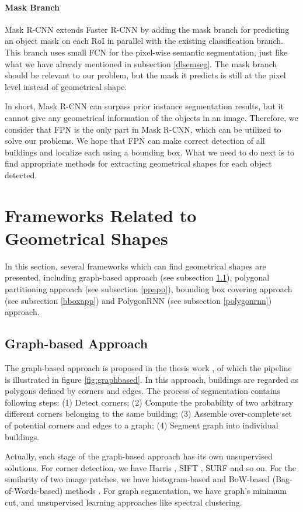 \paragraph{Mask Branch}
Mask R-CNN extends Faster R-CNN by adding the mask branch for predicting an object mask on each RoI in parallel with the existing classification branch. This branch uses small FCN for the pixel-wise semantic segmentation, just like what we have already mentioned in subsection \ref{dlsemseg}. The mask branch should be relevant to our problem, but the mask it predicts is still at the pixel level instead of geometrical shape.

In short, Mask R-CNN can surpass prior instance segmentation results, but it cannot give any geometrical information of the objects in an image. Therefore, we consider that FPN is the only part in Mask R-CNN, which can be utilized to solve our problems. We hope that FPN can make correct detection of all buildings and localize each using a bounding box. What we need to do next is to find appropriate methods for extracting geometrical shapes for each object detected.

\section{Frameworks Related to Geometrical Shapes}\label{frmgeo}
In this section, several frameworks which can find geometrical shapes are presented, including graph-based approach (see subsection \ref{graph}), polygonal partitioning approach (see subsection \ref{ppapp}), bounding box covering approach (see subsection \ref{bboxapp}) and PolygonRNN \cite{polygonrnn} (see subsection \ref{polygonrnn}) approach.

\subsection{Graph-based Approach}\label{graph}
The graph-based approach is proposed in the thesis work \cite{msnadine}, of which the pipeline is illustrated in figure \ref{fig:graphbased}. In this approach, buildings are regarded as polygons defined by corners and edges. The process of segmentation contains following steps: (1) Detect corners; (2) Compute the probability of two arbitrary different corners belonging to the same building; (3) Assemble over-complete set of potential corners and edges to a graph; (4) Segment graph into individual buildings.



Actually, each stage of the graph-based approach has its own unsupervised solutions. For corner detection, we have Harris \cite{harris}, SIFT \cite{sift}, SURF \cite{surf} and so on. For the similarity of two image patches, we have histogram-based \cite{histbook} and BoW-based (Bag-of-Words-based) methods \cite{bow}. For graph segmentation, we have graph's minimum cut, and unsupervised learning approaches like spectral clustering.

